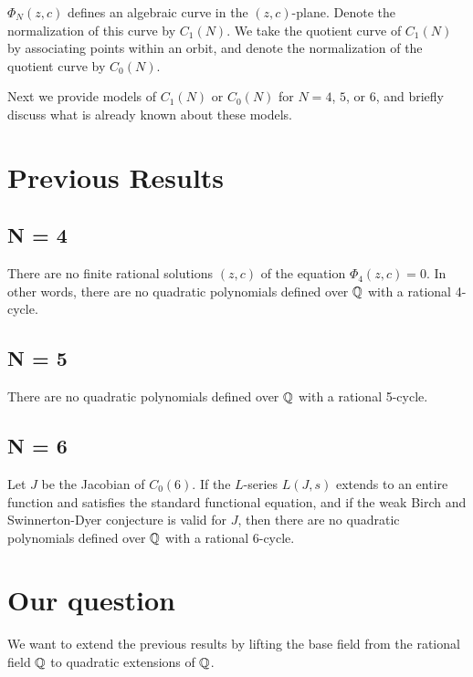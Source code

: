 $\Phi_N(z, c)$ defines an algebraic curve in the $(z,
c)$-plane. Denote the normalization of this curve by $C_1(N)$. We 
take the quotient curve of $C_1(N)$ by associating points within an 
orbit, and denote the normalization of the quotient curve by $C_0(N)$.

Next we provide models of $C_1(N)$ or $C_0(N)$ for $N = 4$, $5$, or
$6$, and briefly discuss what is already known about these models.

\section{Previous Results}
\label{sec:prevres}

\subsection{N = 4}
\begin{theorem}[Morton]
  There are no finite rational solutions $(z, c)$ of the equation
  $\Phi_4(z, c) = 0$. In other words, there are no quadratic
  polynomials defined over $\mathbb{Q}$ with a rational 4-cycle.
\end{theorem}

\subsection{N = 5}
\begin{theorem}
  There are no quadratic polynomials defined over $\mathbb{Q}$ with a rational
  5-cycle.
\end{theorem}

\subsection{N = 6}
\begin{theorem}[Stoll]
  Let $J$ be the Jacobian of $C_0(6)$. If the $L$-series $L(J,s)$
  extends to an entire function and satisfies the standard functional
  equation, and if the weak Birch and Swinnerton-Dyer conjecture is
  valid for $J$, then there are no quadratic polynomials defined over
  $\mathbb{Q}$ with a rational 6-cycle.
\end{theorem}

\section{Our question}
\label{sec:ourq}

We want to extend the previous results by lifting the base field 
from the rational field $\mathbb{Q}$ to quadratic extensions of $\mathbb{Q}$.

